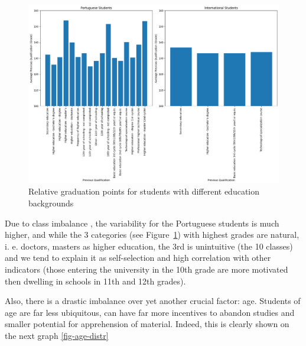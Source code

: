 \documentclass[
  letterpaper,
  DIV=11,
  numbers=noendperiod]{scrartcl}
\begin{document}
\begin{figure}

{\centering \includegraphics{report_AzadhdhinNedalYunisAlFraijat_files/figure-pdf/fig-education-output-1.png}

}

\caption{\label{fig-education}Relative graduation points for students
with different education backgrounds}

\end{figure}

Due to class imbalance , the variability for the Portuguese students is
much higher, and while the 3 categories (see Figure~\ref{fig-education})
with highest grades are natural, i. e. doctors, masters as higher
education, the 3rd is unintuitive (the 10 classes) and we tend to
explain it as self-selection and high correlation with other indicators
(those entering the university in the 10th grade are more motivated then
dwelling in schools in 11th and 12th grades).

Also, there is a drastic imbalance over yet another crucial factor: age.
Students of age are far less ubiquitous, can have far more incentives to
abandon studies and smaller potential for apprehension of material.
Indeed, this is clearly shown on the next graph \ref{fig-age-distr}
\end{document}
